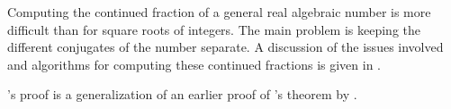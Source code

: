   Computing the continued fraction of a
general real algebraic number is more difficult than for square roots
of integers.  The main problem is keeping the different conjugates of
the number separate.  A discussion of the issues involved and
algorithms for computing these continued fractions is given in
\cite{Cantor1972-ph,Thull1984-vj}.

 {\Nathanson}'s proof is a
generalization of an earlier proof of {\Hurwitz}'s theorem by {\CohnJHE}
\cite{Cohn1973-pc}.

\normalsize


